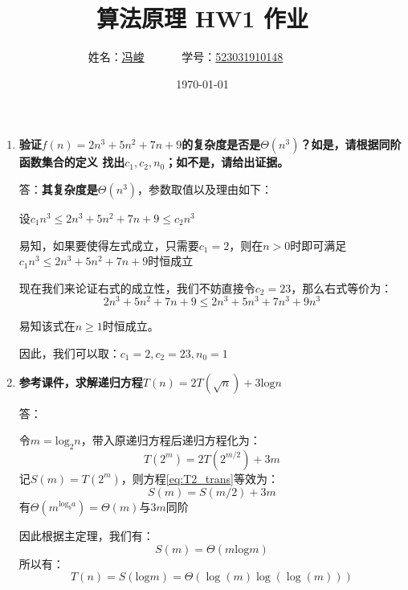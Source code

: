 \documentclass[UTF8,12pt,a4paper]{ctexart}
\title{算法原理 HW1 作业}
\author{
	姓名：\underline{冯峻}~~~~~~
	学号：\underline{523031910148}~~~~~~}
\date{\today}
\begin{document}
\fancyfoot[C]{\thepage}

\maketitle

\begin{enumerate}[1.]
	\item \textbf{验证$f(n) = 2n^3+5n^2+7n+9$的复杂度是否是$\Theta(n^3)$？如是，请根据同阶函数集合的定义
	找出$c_1, c_2, n_0$；如不是，请给出证据。}

	答：\textbf{其复杂度是$\Theta(n^3)$}，参数取值以及理由如下：
	
	设$c_1 n^3 \leq 2n^3+5n^2+7n+9 \leq c_2 n^3$

	易知，如果要使得左式成立，只需要$c_1 = 2$，则在$n > 0$时即可满足$c_1 n^3 \leq 2n^3+5n^2+7n+9$时恒成立

	现在我们来论证右式的成立性，我们不妨直接令$c_2 = 23$，那么右式等价为：
	\begin{equation}
		2n^3+5n^2+7n+9 \leq 2n^3+5n^3+7n^3+9n^3
		\label{eq:T1}
	\end{equation}

	易知该式在$n\geq1$时恒成立。

	因此，我们可以取：$c_1 = 2, c_2 = 23, n_0 = 1$
	\item \textbf{参考课件，求解递归方程$T(n)=2T(\sqrt{n})+3\text{log}n$}

	答：

	令$m=\text{log}_2 n$，带入原递归方程后递归方程化为：
	\begin{equation}
		T(2^m)=2T(2^{m/2})+3m
		\label{eq:T2_trans}
	\end{equation}
	记$S(m) = T(2^m)$，则方程\eqref{eq:T2_trans}等效为：
	\begin{equation}
		S(m) = S(m/2) + 3m
		\label{eq:T_trans_2}
	\end{equation}
	有$\Theta(m^{\text{log}_{b}a})=\Theta(m)\text{与}3m\text{同阶}$
	
	因此根据主定理，我们有：
	\begin{equation}
		S(m) = \Theta(m\text{log}m)
	\end{equation}
	所以有：
	\begin{equation}
		T(n) = S(\text{log}m) = \Theta(\log(m)\log(\log(m)))
	\end{equation}


\end{enumerate}
\end{document}
